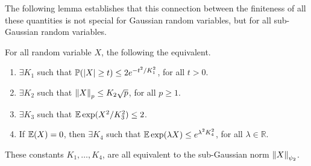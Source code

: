 \documentclass[12pt]{article}
\begin{document}
The following lemma establishes that this connection between the finiteness of all these quantities is not special for Gaussian random variables, but for all sub-Gaussian random variables.

\begin{lemma}
    For all random variable $X$, the following the equivalent.
    \begin{enumerate}
        \item $\exists K_1$ such that $\mathbb{P}(\left\lvert X \right\rvert \geq t) \leq 2 e^{-t^2/K_1^2}$, for all $t > 0$.
        \item $\exists K_2$ such that $\left\Vert X \right\Vert_p \leq K_2 \sqrt{p}$, for all $p \geq 1$.
        \item $\exists K_3$ such that $\mathbb{E}\exp(X^2/K_3^2) \leq 2$.
        \item If $\mathbb{E}(X) = 0$, then $\exists K_4$ such that $\mathbb{E}\exp(\lambda X) \leq e^{\lambda^2 K_4^2}$, for all $\lambda \in \mathbb{R}$.
    \end{enumerate}
    \noindent These constants $K_1, \dots, K_4$, are all equivalent to the sub-Gaussian norm $\left\Vert X \right\Vert_{\psi_2}$.
\end{lemma}
\end{document}
